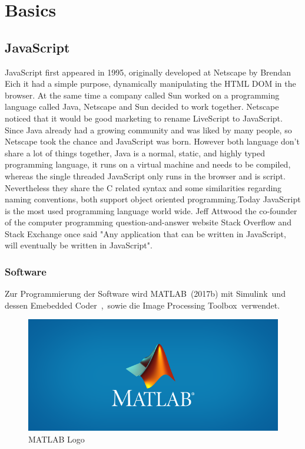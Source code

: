 \chapter{Basics}

\section{JavaScript}
JavaScript first appeared in 1995, originally developed at Netscape by Brendan Eich it had a simple purpose, dynamically manipulating the HTML DOM in the browser. At the same time a company called Sun worked on a programming language called Java, Netscape and Sun decided to work together. Netscape noticed that it would be good marketing to rename LiveScript to JavaScript. Since Java already had a growing community and was liked by many people, so Netscape took the chance and JavaScript was born. However both language don't share a lot of things together, Java is a normal, static, and highly typed programming language, it runs on a virtual machine and needs to be compiled, whereas the single threaded JavaScript only runs in the browser and is script. Nevertheless they share the C related syntax and some similarities regarding naming conventions, both support object oriented programming.Today JavaScript is the most used programming language world wide. Jeff Attwood the co-founder of the  computer programming question-and-answer website Stack Overflow and Stack Exchange once said "Any application that can be written in JavaScript, will eventually be written in JavaScript".


\subsection{Software}
Zur Programmierung der Software wird MATLAB\textregistered\ (2017b) mit Simulink\textregistered\ und dessen Emebedded Coder\texttrademark\ ,\ sowie die Image Processing Toolbox\texttrademark\ verwendet.


\begin{figure}[hb]
	\centering
	\includegraphics[scale=0.5]{bilder/MATLABLogo.png}
	\caption{MATLAB Logo}
	\label{fig:MATLAB}
\end{figure}



